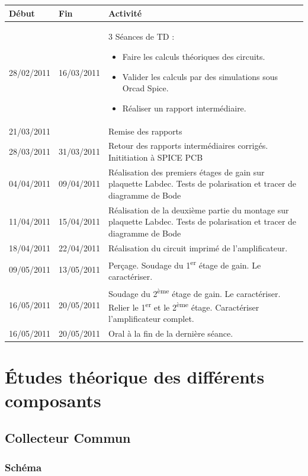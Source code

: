 \documentclass[11pt;a4paper]{report}
\begin{document}
    \begin{tabular}{|p{2cm}|p{2cm}|p{12cm}|}
     \hline Début & Fin & Activité \\
     \hline 28/02/2011 & 16/03/2011 & 3 Séances de TD : 
      \begin{itemize}
       \item Faire les calculs théoriques des circuits.
       \item Valider les calculs par des simulations sous Orcad Spice.
       \item Réaliser un rapport intermédiaire.
      \end{itemize} \\
     \hline 21/03/2011 & & Remise des rapports \\
     \hline 28/03/2011 & 31/03/2011 & Retour des rapports intermédiaires corrigés. Inititiation à SPICE PCB \\
     \hline 04/04/2011 & 09/04/2011 & Réalisation des premiers étages de gain sur plaquette Labdec. Tests de polarisation et tracer de diagramme de Bode \\
     \hline 11/04/2011 & 15/04/2011 & Réalisation de la deuxième partie du montage sur plaquette Labdec. Tests de polarisation et tracer de diagramme de Bode \\
     \hline 18/04/2011 & 22/04/2011 & Réalisation du circuit imprimé de l'amplificateur. \\
     \hline 09/05/2011 & 13/05/2011 & Perçage. Soudage du 1\textsuperscript{er} étage de gain. Le caractériser. \\
     \hline 16/05/2011 & 20/05/2011 & Soudage du 2\textsuperscript{ème} étage de gain. Le caractériser. Relier le 1\textsuperscript{er} et le 2\textsuperscript{ème} étage. Caractériser l'amplificateur complet. \\
     \hline 16/05/2011 & 20/05/2011 & Oral à la fin de la dernière séance. \\
     \hline
    \end{tabular}



 \chapter{Études théorique des différents composants}
  \section{Collecteur Commun}
   \subsection{Schéma}
\end{document}
